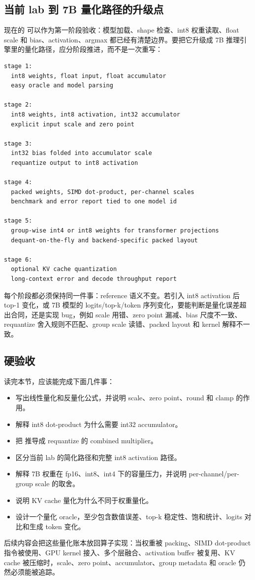 \subsection{当前 lab 到 7B 量化路径的升级点}

现在的  可以作为第一阶段验收：模型加载、shape 检查、int8 权重读取、float scale 和 bias、activation、argmax 都已经有清楚边界。要把它升级成 7B 推理引擎里的量化路径，应分阶段推进，而不是一次重写：

\begin{lstlisting}[numbers=none,caption={从教学线性层到完整 int8 kernel 的阶段}]
stage 1:
  int8 weights, float input, float accumulator
  easy oracle and model parsing

stage 2:
  int8 weights, int8 activation, int32 accumulator
  explicit input scale and zero point

stage 3:
  int32 bias folded into accumulator scale
  requantize output to int8 activation

stage 4:
  packed weights, SIMD dot-product, per-channel scales
  benchmark and error report tied to one model id

stage 5:
  group-wise int4 or int8 weights for transformer projections
  dequant-on-the-fly and backend-specific packed layout

stage 6:
  optional KV cache quantization
  long-context error and decode throughput report
\end{lstlisting}

每个阶段都必须保持同一件事：reference 语义不变。若引入 int8 activation 后 top-1 变化，或 7B 模型的 logits/top-k/token 序列变化，要能判断是量化误差超出合同，还是实现 bug，例如 scale 用错、zero point 漏减、bias 尺度不一致、requantize 舍入规则不匹配、group scale 读错、packed layout 和 kernel 解释不一致。

\subsection{硬验收}

读完本节，应该能完成下面几件事：

\begin{itemize}
  \item 写出线性量化和反量化公式，并说明 scale、zero point、round 和 clamp 的作用。
  \item 解释 int8 dot-product 为什么需要 int32 accumulator。
  \item 把  推导成 requantize 的 combined multiplier。
  \item 区分当前 lab 的简化路径和完整 int8 activation 路径。
  \item 解释 7B 权重在 fp16、int8、int4 下的容量压力，并说明 per-channel/per-group scale 的取舍。
  \item 说明 KV cache 量化为什么不同于权重量化。
  \item 设计一个量化 oracle，至少包含数值误差、top-k 稳定性、饱和统计、logits 对比和生成 token 变化。
\end{itemize}

后续内容会把这些量化账本放回算子实现：当权重被 packing、SIMD dot-product 指令被使用、GPU kernel 接入、多个层融合、activation buffer 被复用、KV cache 被压缩时，scale、zero point、accumulator、group metadata 和 oracle 仍然必须能被追踪。
